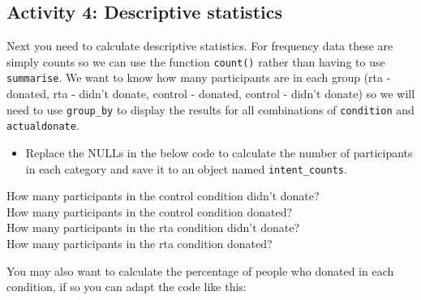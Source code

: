 \documentclass[]{book}
\newenvironment{Shaded}{\begin{snugshade}}{\end{snugshade}}
\newcommand{\CommentTok}[1]{\textcolor[rgb]{0.56,0.35,0.01}{\textit{#1}}}
\newcommand{\DataTypeTok}[1]{\textcolor[rgb]{0.13,0.29,0.53}{#1}}
\newcommand{\DecValTok}[1]{\textcolor[rgb]{0.00,0.00,0.81}{#1}}
\newcommand{\KeywordTok}[1]{\textcolor[rgb]{0.13,0.29,0.53}{\textbf{#1}}}
\newcommand{\NormalTok}[1]{#1}
\newcommand{\OperatorTok}[1]{\textcolor[rgb]{0.81,0.36,0.00}{\textbf{#1}}}
\newcommand{\OtherTok}[1]{\textcolor[rgb]{0.56,0.35,0.01}{#1}}
\newcommand{\StringTok}[1]{\textcolor[rgb]{0.31,0.60,0.02}{#1}}
\providecommand{\tightlist}{%
  \setlength{\itemsep}{0pt}\setlength{\parskip}{0pt}}
\begin{document}
\hypertarget{activity-4-descriptive-statistics}{%
\subsection{Activity 4: Descriptive statistics}\label{activity-4-descriptive-statistics}}

Next you need to calculate descriptive statistics. For frequency data these are simply counts so we can use the function \texttt{count()} rather than having to use \texttt{summarise}. We want to know how many participants are in each group (rta - donated, rta - didn't donate, control - donated, control - didn't donate) so we will need to use \texttt{group\_by} to display the results for all combinations of \texttt{condition} and \texttt{actualdonate}.

\begin{itemize}
\tightlist
\item
  Replace the NULLs in the below code to calculate the number of participants in each category and save it to an object named \texttt{intent\_counts}.
\end{itemize}

\begin{Shaded}
\end{Shaded}

How many participants in the control condition didn't donate? \\
How many participants in the control condition donated? \\
How many participants in the rta condition didn't donate? \\
How many participants in the rta condition donated?

You may also want to calculate the percentage of people who donated in each condition, if so you can adapt the code like this:

\begin{Shaded}
\end{Shaded}
\end{document}
